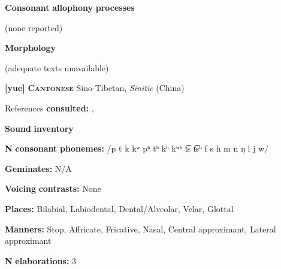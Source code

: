 \begin{styleBody}
\textbf{Consonant} \textbf{allophony} \textbf{processes}
\end{styleBody}

\begin{styleBody}
(none reported) 
\end{styleBody}

\begin{styleBody}
\textbf{Morphology}
\end{styleBody}

\begin{styleBody}
(adequate texts unavailable)
\end{styleBody}

\begin{styleBody}
\textbf{[yue]}   \textbf{\textsc{Cantonese}}  Sino-Tibetan, \textit{Sinitic} (China)
\end{styleBody}

\begin{styleBody}
References \textbf{consulted:} \citet{BauerBenedict1997}, \citet{MatthewsYip1994}
\end{styleBody}

\begin{styleBody}
\textbf{Sound} \textbf{inventory}
\end{styleBody}

\begin{styleBody}
\textbf{N} \textbf{consonant} \textbf{phonemes:} /p t k kʷ pʰ tʰ kʰ kʷʰ t͡s t͡sʰ f s h m n ŋ l j w/
\end{styleBody}

\begin{styleBody}
\textbf{Geminates:} N/A
\end{styleBody}

\begin{styleBody}
\textbf{Voicing} \textbf{contrasts:} None
\end{styleBody}

\begin{styleBody}
\textbf{Places:} Bilabial, Labiodental, Dental/Alveolar, Velar, Glottal
\end{styleBody}

\begin{styleBody}
\textbf{Manners:} Stop, Affricate, Fricative, Nasal, Central approximant, Lateral approximant
\end{styleBody}

\begin{styleBody}
\textbf{N} \textbf{elaborations:} 3
\end{styleBody}

